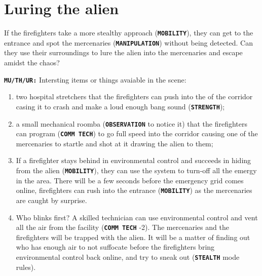 \section{Luring the alien}

\begin{rpg-commentbox}{}
   If the firefighters take a more stealthy  approach (\texttt{\textbf{MOBILITY}}), they can get to the entrance and spot the mercenaries (\texttt{\textbf{MANIPULATION}}) without being detected. Can they use their surroundings to lure the alien into the mercenaries and escape amidst the chaos?

   \texttt{\textbf{MU/TH/UR:}} Intersting items or things avaiable in the scene:


\begin{enumerate}
    \item two hospital stretchers that the firefighters can push into the of the corridor casing it to crash and make a loud enough bang sound (\texttt{\textbf{STRENGTH}});
    \item a small mechanical roomba (\texttt{\textbf{OBSERVATION}} to notice it) that the firefighters can program (\texttt{\textbf{COMM TECH}}) to go full speed into the corridor causing one of the mercenaries to startle and shot at it drawing the alien to them;
    \item If a firefighter stays behind in environmental control and succeeds in hiding from the alien (\texttt{\textbf{MOBILITY}}), they can use the system to turn-off all the emergy in the area. There will be a few seconds before the emergency grid comes online, firefighters can rush into the entrance (\texttt{\textbf{MOBILITY}}) as the mercenaries are caught by surprise.    
\end{enumerate}
\end{rpg-commentbox}

\clearpage

\begin{rpg-commentbox}{}
\begin{enumerate}
    \setcounter{enumi}{3}
    \item Who blinks first? A skilled technician can use environmental control and vent all the air from the facility (\texttt{\textbf{COMM TECH}} -2). The mercenaries and the firefighters will be trapped with the alien. It will be a matter of finding out who has enough air to not suffocate before the firefighters bring environmental control back online, and try to sneak out (\texttt{\textbf{STEALTH}} mode rules). 
\end{enumerate}
\end{rpg-commentbox}


